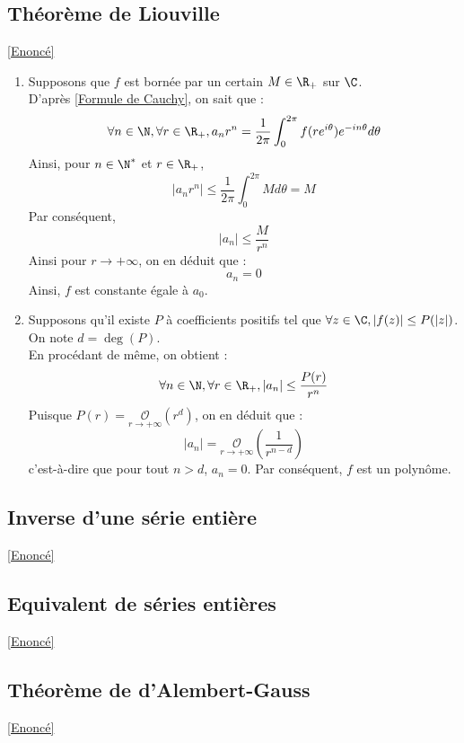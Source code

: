 \documentclass{book}
\begin{document}
	\subsection{Théorème de Liouville}\label{sec:theoreme-de-liouville}
	\textcolor{blue}{\hyperref[Théorème de Liouville]{[Enoncé]}}\\
	\begin{enumerate}
		\item Supposons que $f$ est bornée par un certain $M\in\R_+$ sur $\C$.\\
		D'après \ref{Formule de Cauchy}, on sait que :
		\[\forall n\in\N,\forall r\in\R_+, a_nr^n=\frac{1}{2\pi}\int_{0}^{2\pi}f(re^{i\theta})e^{-in\theta}d\theta\]
		Ainsi, pour $n\in\N^*$ et $r\in\R_+$, \[|a_nr^n|\leq \frac{1}{2\pi}\int_{0}^{2\pi}Md\theta=M\]
		Par conséquent, \[|a_n|\leq\frac{M}{r^n}\]
		Ainsi pour $r\to+\infty$, on en déduit que :\[a_n=0\]
		Ainsi, $f$ est constante égale à $a_0$.
		\item Supposons qu'il existe $P$ à coefficients positifs tel que $\forall z\in\C, |f(z)|\leq P(|z|)$.\\
		On note $d=\deg(P)$.\\
		En procédant de même, on obtient :
		\[\forall n\in\N, \forall r\in\R_+, |a_n|\leq \frac{P(r)}{r^n}\]
		Puisque $\displaystyle P(r)=\underset{r\to+\infty}{\mathcal{O}}\left(r^d\right)$, on en déduit que :
		\[|a_n|=\underset{r\to+\infty}{\mathcal{O}}\left(\frac{1}{r^{n-d}}\right)\]
		c'est-à-dire que pour tout $n>d$, $a_n=0$.
		Par conséquent, $f$ est un polynôme.
	\end{enumerate}
	
	\subsection{Inverse d'une série entière}
	\label{sec:inverse-dune-serie-entiere}
	\textcolor{blue}{\hyperref[Inverse d'une série entière]{[Enoncé]}}\\
	
	\subsection{Equivalent de séries entières}
	\label{sec:equivalent-de-series-entieres}
	\textcolor{blue}{\hyperref[Equivalent de séries entières]{[Enoncé]}}\\
	
	\subsection{Théorème de d'Alembert-Gauss}
	\label{sec:theoreme-de-dalembert-gauss}
	\textcolor{blue}{\hyperref[Théorème de d'Alembert-Gauss]{[Enoncé]}}\\
	
\end{document}
